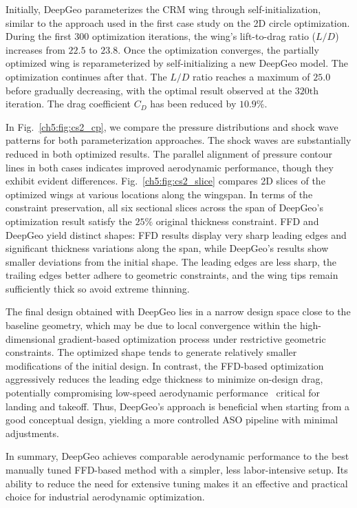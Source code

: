 Initially, DeepGeo parameterizes the CRM wing through self-initialization, similar to the approach used in the first case study on the 2D circle optimization. During the first 300 optimization iterations, the wing's lift-to-drag ratio ($L/D$) increases from $22.5$ to $23.8$.
Once the optimization converges, the partially optimized wing is reparameterized by self-initializing a new DeepGeo model.
The optimization continues after that.
The $L/D$ ratio reaches a maximum of $25.0$ before gradually decreasing, with the optimal result observed at the $320\text{th}$ iteration. The drag coefficient $C_D$ has been reduced by $10.9\%$.

In Fig.~\ref{ch5:fig:cs2_cp}, we compare the pressure distributions and shock wave patterns for both parameterization approaches. 
The shock waves are substantially reduced in both optimized results. The parallel alignment of pressure contour lines in both cases indicates improved aerodynamic performance, though they exhibit evident differences.
Fig.~\ref{ch5:fig:cs2_slice} compares 2D slices of the optimized wings at various locations along the wingspan. In terms of the constraint preservation, all six sectional slices across the span of DeepGeo's optimization result satisfy the $25\%$ original thickness constraint. FFD and DeepGeo yield distinct shapes: FFD results display very sharp leading edges and significant thickness variations along the span, while DeepGeo’s results show smaller deviations from the initial shape. The leading edges are less sharp, the trailing edges better adhere to geometric constraints, and the wing tips remain sufficiently thick so avoid extreme thinning.

The final design obtained with DeepGeo lies in a narrow design space close to the baseline geometry, which may be due to local convergence within the high-dimensional gradient-based optimization process under restrictive geometric constraints. 
The optimized shape tends to generate relatively smaller modifications of the initial design.
In contrast, the FFD-based optimization aggressively reduces the leading edge thickness to minimize on-design drag, potentially compromising low-speed aerodynamic performance~\cite{aa.Li2019} critical for landing and takeoff. Thus, DeepGeo’s approach is beneficial when starting from a good conceptual design, yielding a more controlled ASO pipeline with minimal adjustments.

In summary, DeepGeo achieves comparable aerodynamic performance to the best manually tuned FFD-based method with a simpler, less labor-intensive setup. Its ability to reduce the need for extensive tuning makes it an effective and practical choice for industrial aerodynamic optimization.